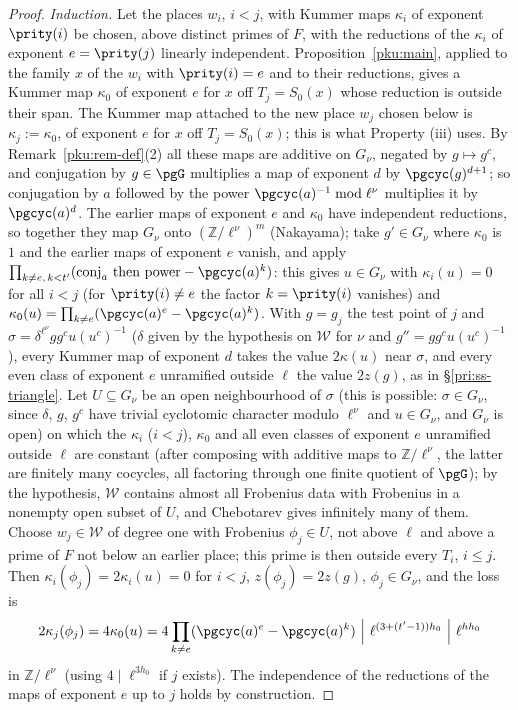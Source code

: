 \documentclass[10pt]{amsart}
\theoremstyle{definition}
\theoremstyle{remark}
\newcommand{\Z}{\mathbb Z}
\begin{document}
\begin{proof}
\emph{Induction.} Let the places $w_i$, $i<j$, with Kummer maps $\kappa_i$ of exponent $\prity(i)$
be chosen, above distinct primes of $F$, with the reductions of the $\kappa_i$ of exponent
$e=\prity(j)$ linearly independent. Proposition~\ref{pku:main}, applied to the family $x$ of the
$w_i$ with $\prity(i)=e$ and to their reductions, gives a Kummer map $\kappa_0$ of exponent $e$ for
$x$ off $T_j=S_0(x)$ whose reduction is outside their span. The Kummer map attached to the new
place $w_j$ chosen below is $\kappa_j:=\kappa_0$, of exponent $e$ for $x$ off $T_j=S_0(x)$; this is
what Property (iii) uses. By Remark~\ref{pku:rem-def}(2) all these
maps are additive on $G_\nu$, negated by $g\mapsto g^c$, and conjugation by $g\in\pgG$ multiplies a
map of exponent $d$ by $\pgcyc(g)^{d+1}$; so conjugation by $a$ followed by the power
$\pgcyc(a)^{-1}\bmod\ell^\nu$ multiplies it by $\pgcyc(a)^d$. The earlier maps of exponent $e$ and
$\kappa_0$ have independent reductions, so together they map $G_\nu$ onto $(\Z/\ell^\nu)^{m}$
(Nakayama); take $g'\in G_\nu$ where $\kappa_0$ is $1$ and the earlier maps of exponent $e$ vanish,
and apply $\prod_{k\ne e,\,k<t'}(\text{conj}_a\text{ then power}-\pgcyc(a)^k)$: this gives $u\in
G_\nu$ with $\kappa_i(u)=0$ for all $i<j$ (for $\prity(i)\ne e$ the factor $k=\prity(i)$ vanishes) and
$\kappa_0(u)=\prod_{k\ne e}(\pgcyc(a)^e-\pgcyc(a)^k)$. With $g=g_j$ the test point of $j$ and
$\sigma=\delta^{\ell^\nu}gg^cu(u^c)^{-1}$ ($\delta$ given by the hypothesis on $\mathcal W$ for $\nu$
and $g''=gg^cu(u^c)^{-1}$), every
Kummer map of exponent $d$ takes the value $2\kappa(u)$ near $\sigma$, and every even class of
exponent $e$ unramified outside $\ell$ the value $2z(g)$, as in \S\ref{pri:ss-triangle}. Let $U\subseteq G_\nu$ be an open neighbourhood of $\sigma$ (this is possible: $\sigma\in G_\nu$,
since $\delta$, $g$, $g^c$ have trivial cyclotomic character modulo $\ell^\nu$ and $u\in G_\nu$, and
$G_\nu$ is open) on which the
$\kappa_i$ ($i<j$), $\kappa_0$ and all even classes of exponent $e$ unramified outside $\ell$ are
constant (after composing with additive maps to $\Z/\ell^\nu$, the latter are finitely many cocycles,
all factoring through one finite quotient of $\pgG$); by the hypothesis, $\mathcal W$ contains almost
all Frobenius data with Frobenius in a nonempty open subset of $U$, and Chebotarev gives infinitely
many of them. Choose $w_j
\in\mathcal W$ of degree one with Frobenius $\phi_j\in U$, not above $\ell$ and above a prime
of $F$ not below an earlier place; this prime is then outside every $T_i$, $i\le j$. Then
$\kappa_i(\phi_j)=2\kappa_i(u)=0$ for $i<j$, $z(\phi_j)=2z(g)$, $\phi_j\in G_\nu$, and the loss is
\[
2\kappa_j(\phi_j)=4\kappa_0(u)=4\prod_{k\ne e}(\pgcyc(a)^e-\pgcyc(a)^k)\ \Big|\ \ell^{(3+(t'-1))h_0}
\ \Big|\ \ell^{hh_0}
\]
in $\Z/\ell^\nu$ (using $4\mid\ell^{3h_0}$ if $j$ exists). The independence of the reductions of the
maps of exponent $e$ up to $j$ holds by construction.


\end{proof}
\end{document}

